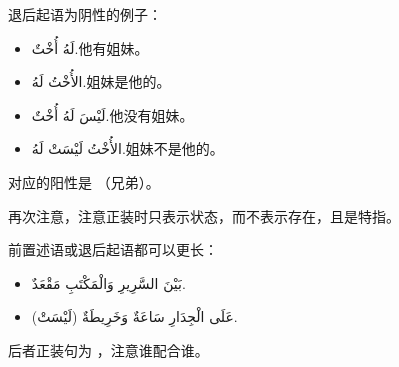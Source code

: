 退后起语为阴性的例子：

\begin{itemize}
    \item \ac{لَهُ أُخْتٌ.}{他有姐妹。}
    \item \ac{الأُخْتُ لَهُ.}{姐妹是他的。}
    \item \ac{لَيْسَ لَهُ أُخْتٌ.}{他没有姐妹。}
    \item \ac{الأُخْتُ لَيْسَتْ لَهُ.}{姐妹不是他的。}
\end{itemize}

\begin{attention}
     对应的阳性是  （兄弟）。
\end{attention}

再次注意，注意正装时只表示状态，而不表示存在，且是特指。

前置述语或退后起语都可以更长：

\begin{Arabic}
    \begin{itemize}
        \item بَيْنَ السَّرِيرِ وَالْمَكْتَبِ مَقْعَدٌ.
        \item (لَيْسَتْ) عَلَى الْجِدَارِ سَاعَةٌ وَخَرِيطَةٌ.
    \end{itemize}
\end{Arabic}

后者正装句为  ，注意谁配合谁。